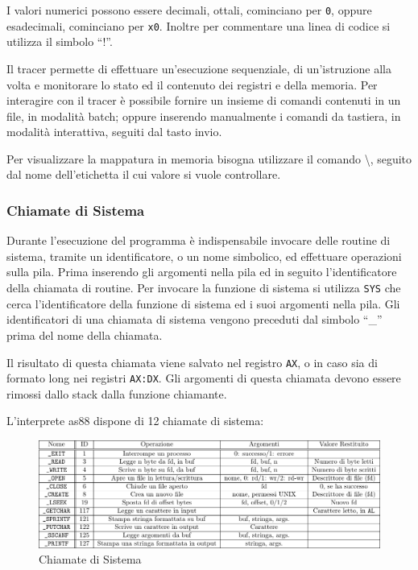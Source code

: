 \documentclass{article}
\numberwithin{equation}{subsection}
\begin{document}
I valori numerici possono essere decimali, ottali, cominciano per \verb|0|, oppure esadecimali, cominciano per \verb|x0|. 
Inoltre per commentare una linea di codice si utilizza il simbolo ``!''. 


Il tracer permette di effettuare un'esecuzione sequenziale, di un'istruzione alla volta e monitorare lo stato ed il contenuto dei registri e della memoria. Per interagire con il tracer è possibile fornire un 
insieme di comandi contenuti in un file, in modalità batch; oppure inserendo manualmente i comandi da tastiera, in modalità interattiva, seguiti dal tasto invio. 

Per visualizzare la mappatura in memoria bisogna utilizzare il comando \textbackslash, seguito dal nome dell'etichetta il cui valore si vuole controllare. 

\subsubsection{Chiamate di Sistema}

Durante l'esecuzione del programma è indispensabile invocare delle routine di sistema, tramite un identificatore, o un nome simbolico, ed effettuare operazioni sulla pila. Prima inserendo gli 
argomenti nella pila ed in seguito l'identificatore della chiamata di routine. Per invocare la funzione di sistema si utilizza \verb|SYS| che cerca l'identificatore 
della funzione di sistema ed i suoi argomenti nella pila. 
Gli identificatori di una chiamata di sistema vengono preceduti dal simbolo ``\_'' prima del nome della chiamata. 

Il risultato di questa chiamata viene salvato nel registro \verb|AX|, o in caso sia di formato long nei registri \verb|AX:DX|. Gli argomenti di questa chiamata devono essere rimossi dallo stack dalla funzione 
chiamante. 

L'interprete as88 dispone di 12 chiamate di sistema:

\begin{figure}[H]%
    \centering%
    \includegraphics[scale=0.8]{chiamate-sistema.pdf}%
    \caption{Chiamate di Sistema}%
\end{figure}
\end{document}
